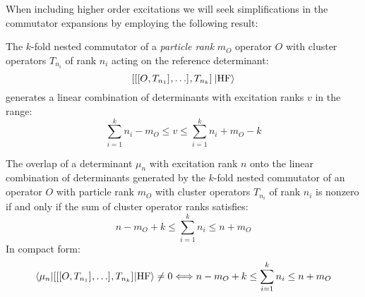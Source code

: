 When including higher order excitations we will seek simplifications in the commutator expansions
by employing the following result:\autocite{Helgaker2000-tz}
\begin{lemma}\label{lemma:exc-rank}
The $k$-fold nested commutator of a \emph{particle rank} $m_O$ operator $O$ with
cluster operators $T_{n_i}$ of rank $n_i$ acting on the reference determinant:
\begin{equation}
  [ [ [ O, T_{n_1} ]^{}, \ldots ]^{}, T_{n_k} ]^{} \ket{\mathrm{HF}}
\end{equation}
generates a linear combination of determinants with excitation ranks $v$ in the
range:
\begin{equation}
  \sum_{i=1}^k n_i - m_O \leq v \leq \sum_{i=1}^k n_i + m_O -k
\end{equation}
\end{lemma}
\begin{corollary}
The overlap of a determinant $\mu_n$ with excitation rank $n$ onto the linear
combination of determinants generated by the $k$-fold nested commutator of an
operator $O$ with particle rank $m_O$ with cluster operators $T_{n_i}$ of rank $n_i$ is
nonzero if and only if the sum of cluster operator ranks satisfies:
\begin{equation}
  n - m_O + k \leq \sum_{i=1}^k n_i \leq n + m_O
\end{equation}
In compact form:
\begin{equation}
  \braket{\mu_n |
  [ [ [ O, T_{n_1} ]^{}, \ldots ]^{}, T_{n_k} ]^{} | \mathrm{HF}} \neq 0
  \Longleftrightarrow
  n - m_O + k \leq \sum_{i=1}^k n_i \leq n + m_O
\end{equation}
\end{corollary}

